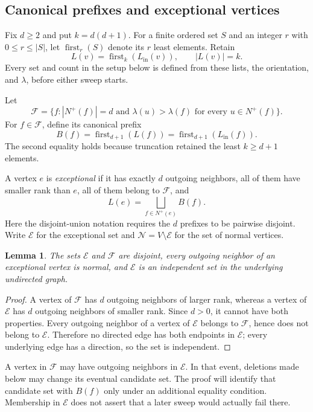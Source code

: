 \documentclass[11pt,a4paper]{article}
\numberwithin{equation}{section}
\newtheorem{lemma}[theorem]{Lemma}
\newcommand{\Nout}{N^{+}}
\newcommand{\Lin}{L_{\mathrm{in}}}
\newcommand{\full}{\mathcal F}
\newcommand{\exc}{\mathcal E}
\newcommand{\normal}{\mathcal N}
\newcommand{\first}{\operatorname{first}}
\begin{document}
\subsection{Canonical prefixes and exceptional vertices}

Fix \(d\geq2\) and put \(k=d(d+1)\). For a finite ordered set \(S\)
and an integer \(r\) with \(0\leq r\leq|S|\), let
\(\first_r(S)\) denote its \(r\) least elements. Retain
\[
 L(v)=\first_k(\Lin(v)),
 \qquad |L(v)|=k.
\]
Every set and count in the setup below is defined from these lists,
the orientation, and \(\lambda\), before either sweep starts.

Let
\[
 \full=\{f:|\Nout(f)|=d
       \text{ and }\lambda(u)>\lambda(f)
       \text{ for every }u\in\Nout(f)\}.
\]
For \(f\in\full\), define its canonical prefix
\begin{equation}
 B(f)=\first_{d+1}(L(f))
     =\first_{d+1}(\Lin(f)).
 \label{eq:prefix}
\end{equation}
The second equality holds because truncation retained the least
\(k\geq d+1\) elements.

A vertex \(e\) is \emph{exceptional} if it has exactly \(d\) outgoing
neighbors, all of them have smaller rank than \(e\), all of them
belong to \(\full\), and
\begin{equation}
 L(e)=\bigsqcup_{f\in\Nout(e)} B(f).
 \label{eq:partition}
\end{equation}
Here the disjoint-union notation requires the \(d\) prefixes to be
pairwise disjoint. Write \(\exc\) for the exceptional set and
\(\normal=V\setminus\exc\) for the set of normal vertices.

\begin{lemma}
\label{lem:independent}
The sets \(\exc\) and \(\full\) are disjoint, every outgoing
neighbor of an exceptional vertex is normal, and \(\exc\) is an
independent set in the underlying undirected graph.
\end{lemma}
\begin{proof}
A vertex of \(\full\) has \(d\) outgoing neighbors of larger rank,
whereas a vertex of \(\exc\) has \(d\) outgoing neighbors of smaller
rank. Since \(d>0\), it cannot have both properties. Every outgoing
neighbor of a vertex of \(\exc\) belongs to \(\full\), hence does
not belong to \(\exc\). Therefore no directed edge has both endpoints
in \(\exc\); every underlying edge has a direction, so the set is
independent.
\end{proof}

A vertex in \(\full\) may have outgoing neighbors in \(\exc\).
In that event, deletions made below may change its eventual candidate
set. The proof will identify that candidate set with \(B(f)\) only
under an additional equality condition. Membership in \(\exc\)
does not assert that a later sweep would actually fail there.
\end{document}
